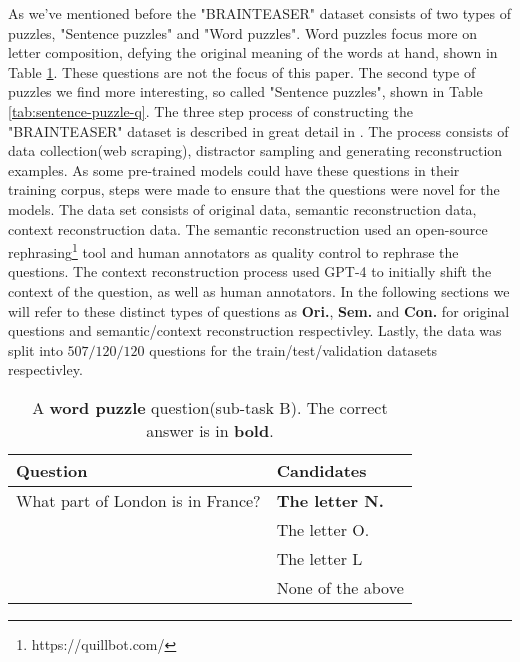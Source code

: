 As we've mentioned before the "BRAINTEASER" dataset consists of two types of puzzles, "Sentence puzzles"
and "Word puzzles".  Word puzzles focus more on letter composition, defying the original meaning
of the words at hand, shown in Table \ref{tab:word-puzzle-q}. These questions are not the focus of this paper.
The second type of puzzles we find more interesting, so called "Sentence puzzles", shown in Table
\ref{tab:sentence-puzzle-q}. The three step process of constructing the "BRAINTEASER" dataset
is described in great detail in \citep{semeval}. The process consists of data collection(web scraping),
distractor sampling and generating reconstruction examples. As some pre-trained models could have
these questions in their training corpus, steps were made to ensure that the questions were novel
for the models.  The data set consists of original data, semantic reconstruction data, context
reconstruction data. The semantic reconstruction used an open-source rephrasing\footnote[3]{https://quillbot.com/} tool and 
human annotators as quality control to rephrase the questions. The context reconstruction process
used GPT-4 to initially shift the context of the question, as well as human annotators. In the 
following sections we will refer to these distinct types of questions as \textbf{Ori.},
\textbf{Sem.} and 
\textbf{Con.} for original questions and semantic/context reconstruction respectivley. Lastly, the
data was split into $507/120/120$ questions for the train/test/validation datasets respectivley.
  

\begin{table}
	\caption{A \textbf{word puzzle} question(sub-task B). The correct answer is in \textbf{bold}.}
	\label{tab:word-puzzle-q}
	\begin{center}
		\begin{tabular}{|p{3cm}|p{3cm}|}
			\toprule
			Question                          & Candidates             \\
			\midrule
			What part of London is in France? & \textbf{The letter N.} \\
			                                  & The letter O.          \\
			                                  & The letter L           \\
			                                  & None of the above      \\
			\bottomrule
		\end{tabular}
	\end{center}
\end{table}





